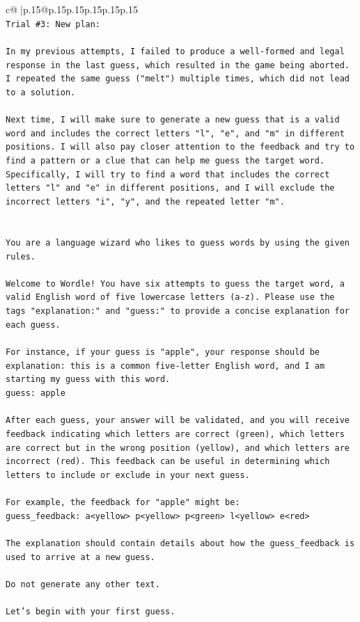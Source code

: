 \documentclass{article}
\begin{document}
{\begin{supertabular}{c@{$\;$}|p{.15\linewidth}@{}p{.15\linewidth}p{.15\linewidth}p{.15\linewidth}p{.15\linewidth}p{.15\linewidth}}
{{{\\ 
\texttt{Trial \#3: New plan: } \\
\\ 
\texttt{In my previous attempts, I failed to produce a well{-}formed and legal response in the last guess, which resulted in the game being aborted. I repeated the same guess ("melt") multiple times, which did not lead to a solution. } \\
\\ 
\texttt{Next time, I will make sure to generate a new guess that is a valid word and includes the correct letters "l", "e", and "m" in different positions. I will also pay closer attention to the feedback and try to find a pattern or a clue that can help me guess the target word. Specifically, I will try to find a word that includes the correct letters "l" and "e" in different positions, and I will exclude the incorrect letters "i", "y", and the repeated letter "m".} \\
\\ 
\\ 
\texttt{You are a language wizard who likes to guess words by using the given rules.} \\
\\ 
\texttt{Welcome to Wordle! You have six attempts to guess the target word, a valid English word of five lowercase letters (a{-}z). Please use the tags "explanation:" and "guess:" to provide a concise explanation for each guess.} \\
\\ 
\texttt{For instance, if your guess is "apple", your response should be} \\
\texttt{explanation: this is a common five{-}letter English word, and I am starting my guess with this word.} \\
\texttt{guess: apple} \\
\\ 
\texttt{After each guess, your answer will be validated, and you will receive feedback indicating which letters are correct (green), which letters are correct but in the wrong position (yellow), and which letters are incorrect (red). This feedback can be useful in determining which letters to include or exclude in your next guess.} \\
\\ 
\texttt{For example, the feedback for "apple" might be:} \\
\texttt{guess\_feedback: a<yellow> p<yellow> p<green> l<yellow> e<red>} \\
\\ 
\texttt{The explanation should contain details about how the guess\_feedback is used to arrive at a new guess.} \\
\\ 
\texttt{Do not generate any other text.} \\
\\ 
\texttt{Let's begin with your first guess.} \\
            }
        }
    }
     \\ \\


\end{supertabular}}
\end{document}
